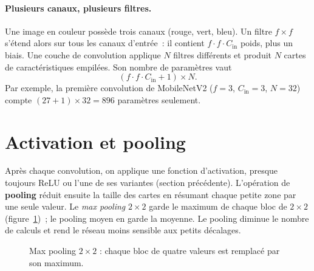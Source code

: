 \paragraph{Plusieurs canaux, plusieurs filtres.} Une image en couleur possède trois canaux (rouge, vert, bleu). Un filtre $f\times f$ s’étend alors sur tous les canaux d’entrée~: il contient $f\cdot f\cdot C_{\text{in}}$ poids, plus un biais. Une couche de convolution applique $N$ filtres différents et produit $N$ cartes de caractéristiques empilées. Son nombre de paramètres vaut
\begin{equation}
  (f\cdot f\cdot C_{\text{in}} + 1)\times N .
\end{equation}
Par exemple, la première convolution de MobileNetV2 ($f=3$, $C_{\text{in}}=3$, $N=32$) compte $(27+1)\times32=896$ paramètres seulement.

\section{Activation et pooling}

Après chaque convolution, on applique une fonction d’activation, presque toujours ReLU ou l’une de ses variantes (section précédente). L’opération de \textbf{pooling} réduit ensuite la taille des cartes en résumant chaque petite zone par une seule valeur. Le \emph{max pooling} $2\times2$ garde le maximum de chaque bloc de $2\times2$ (figure~\ref{fig:pool})~; le pooling moyen en garde la moyenne. Le pooling diminue le nombre de calculs et rend le réseau moins sensible aux petits décalages.

\begin{figure}[H]
\centering
{}
\caption{Max pooling $2\times2$ : chaque bloc de quatre valeurs est remplacé par son maximum.}\label{fig:pool}
\end{figure}

